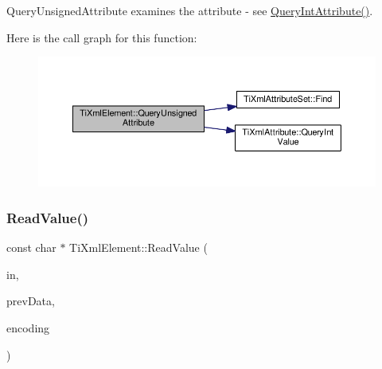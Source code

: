 Query\+Unsigned\+Attribute examines the attribute -\/ see \hyperlink{class_ti_xml_element_a5c0f739e0f6f5905a201364532e54a60}{Query\+Int\+Attribute()}. 

Here is the call graph for this function\+:\nopagebreak
\begin{figure}[H]
\begin{center}
\leavevmode
\includegraphics[width=350pt]{class_ti_xml_element_ab75c83543d4ace62f4c40d7e8e392fc3_cgraph}
\end{center}
\end{figure}
\mbox{\label{class_ti_xml_element_ac786bce103042d3837c4cc2ff6967d41}} 
\subsubsection{\texorpdfstring{Read\+Value()}{ReadValue()}}
{\footnotesize\ttfamily const char $\ast$ Ti\+Xml\+Element\+::\+Read\+Value (\begin{DoxyParamCaption}\item[{const char $\ast$}]{in,  }\item[{\hyperlink{class_ti_xml_parsing_data}{Ti\+Xml\+Parsing\+Data} $\ast$}]{prev\+Data,  }\item[{\hyperlink{tinyxml_8h_a88d51847a13ee0f4b4d320d03d2c4d96}{Ti\+Xml\+Encoding}}]{encoding }\end{DoxyParamCaption})\hspace{0.3cm}{\ttfamily [protected]}}


